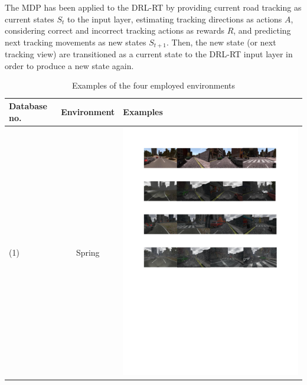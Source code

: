 \documentclass[a4paper,twoside]{article}
\begin{document}
The MDP has been applied to the DRL-RT by providing current road tracking as current states $S_t$ to the input layer, estimating tracking directions as actions $A$, considering correct and incorrect tracking actions as rewards $R$, and predicting next tracking movements as new states $S_{t+1}$. Then, the new state (or next tracking view) are transitioned as a current state to the DRL-RT input layer in order to produce a new state again.
\begin{table}[!t]
	\centering
	\caption{Examples of the four employed environments}
	\label{Table:Environments_Examples}
	\begin{tabular}{|C{1cm}|c|C{11.5cm}|}
		\hline
		\textbf{Database no.} & \textbf{Environment} & \textbf{Examples} \\ \hline
		(1)	& Spring & \begin{minipage}{.9\textwidth}\includegraphics[scale=.7,trim=2cm 24.5cm 2cm 2.5cm,clip]{examples.pdf}\end{minipage} \\ \hline

\end{tabular}
\end{table}
\end{document}
